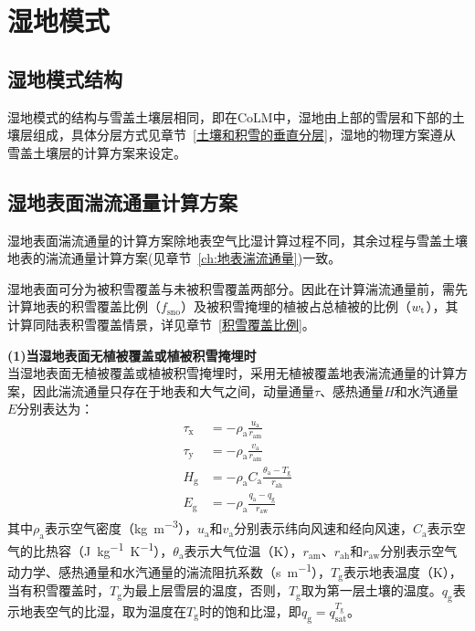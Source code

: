 \chapter{湿地模式}

\section{湿地模式结构}
湿地模式的结构与雪盖土壤层相同，即在CoLM中，湿地由上部的雪层和下部的土壤层组成，具体分层方式见章节~\ref{土壤和积雪的垂直分层}，湿地的物理方案遵从雪盖土壤层的计算方案来设定。

\section{湿地表面湍流通量计算方案}
湿地表面湍流通量的计算方案除地表空气比湿计算过程不同，其余过程与雪盖土壤地表的湍流通量计算方案(见章节~\ref{ch:地表湍流通量})一致。

湿地表面可分为被积雪覆盖与未被积雪覆盖两部分。因此在计算湍流通量前，需先计算地表的积雪覆盖比例（$f_{\mathrm{sno}}$）及被积雪掩埋的植被占总植被的比例（$w_{\rm t}$），其计算同陆表积雪覆盖情景，详见章节~\ref{积雪覆盖比例}。

\textbf {(1)当湿地表面无植被覆盖或植被积雪掩埋时}\\

当湿地表面无植被覆盖或植被积雪掩埋时，采用无植被覆盖地表湍流通量的计算方案，因此湍流通量只存在于地表和大气之间，动量通量$\tau$、感热通量$H$和水汽通量$E$分别表达为：
\begin{align}
  \tau_{\mathrm {x}}  &= -\rho_{\mathrm{a}} \frac{u_{\mathrm{a}}}{r_{\mathrm{am}}} \\
  \tau_{\mathrm {y}}  &= -\rho_{\mathrm{a}} \frac{v_{\mathrm{a}}}{r_{\mathrm{am}}} \\
  H_{\mathrm {g}}  &= -\rho_{\mathrm{a}} C_{\mathrm{a}} \frac{\theta_{\mathrm{a}}-T_{\mathrm {g}} }{r_{\mathrm{ah}}} \\
  E_{\mathrm {g}}  &= -\rho_{\mathrm{a}} \frac{q_{\mathrm{a}}-q_{\mathrm {g}} }{r_{\mathrm{aw}}}
\end{align}
其中$\rho_{\mathrm{a}}$表示空气密度（\unit{kg.m^{-3}}），$u_{\mathrm{a}}$和$v_{\mathrm{a}}$分别表示纬向风速和经向风速，$C_{\mathrm{a}}$表示空气的比热容（\unit{J.kg^{-1}.K^{-1}}），$\theta_{\mathrm{a}}$表示大气位温（K），$r_{\mathrm{am}}$、$r_{\mathrm{ah}}$和$r_{\mathrm{aw}}$分别表示空气动力学、感热通量和水汽通量的湍流阻抗系数（\unit{s.m^{-1}}），$T_{\mathrm {g}} $表示地表温度（K），当有积雪覆盖时，$T_{\mathrm {g}} $为最上层雪层的温度，否则，$T_{\mathrm {g}} $取为第一层土壤的温度。$q_{\mathrm {g}} $表示地表空气的比湿，取为温度在$T_{\mathrm {g}} $时的饱和比湿，即$q_{\mathrm {g}} =q^{T_{\mathrm {g}} }_{\mathrm{sat}}$。

